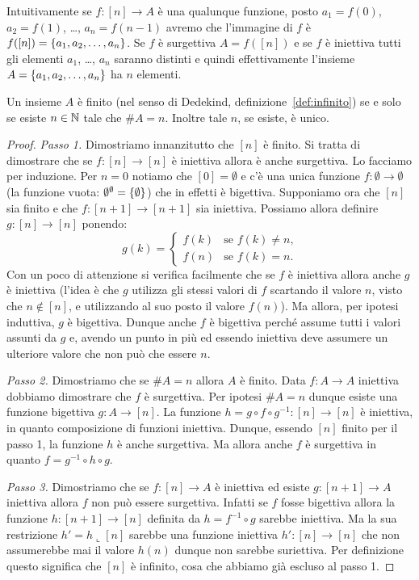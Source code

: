 Intuitivamente se $f\colon [n]\to A$ è una qualunque funzione, 
posto $a_1=f(0)$, $a_2=f(1)$, \dots, $a_{n}=f(n-1)$ 
avremo che l'immagine di $f$ è $f([n]) = {\left\{ a_1,a_2,\dots,a_n \right\}}$.
Se $f$ è surgettiva $A=f([n])$ e se $f$ è iniettiva 
tutti gli elementi $a_1$, \dots, $a_n$ saranno distinti
e quindi effettivamente l'insieme $A={\left\{ a_1,a_2,\dots,a_n \right\}}$
ha $n$ elementi.

\begin{theorem}
  \label{th:cardinali_finiti}%
Un insieme $A$ è finito
(nel senso di Dedekind, definizione~\ref{def:infinito})
se e solo se esiste $n\in {\mathbb N}$ tale che $\#A = n$.
Inoltre tale $n$, se esiste, è unico.
\end{theorem}
\begin{proof}
\emph{Passo 1.} Dimostriamo innanzitutto che $[n]$ è finito.
Si tratta di dimostrare che se $f\colon [n]\to [n]$ è iniettiva allora è anche surgettiva.
Lo facciamo per induzione. 
Per $n=0$ notiamo che $[0]=\emptyset$ e c'è una unica funzione $f\colon \emptyset \to \emptyset$
(la funzione vuota: $\emptyset^\emptyset = {\left\{ \emptyset \right\}}$)
che in effetti è bigettiva.
Supponiamo ora che $[n]$ sia finito e che $f\colon [n+1]\to [n+1]$ sia iniettiva.
Possiamo allora definire $g\colon[n]\to[n]$ ponendo:
\[
  g(k) = \begin{cases}
    f(k) & \text{se $f(k)\neq n$,}\\
    f(n) & \text{se $f(k)=n$.}
  \end{cases}
\]
Con un poco di attenzione si verifica facilmente che se $f$ è iniettiva allora anche $g$ è iniettiva
(l'idea è che $g$ utilizza gli stessi valori di $f$ scartando il valore $n$, visto che $n\not \in [n]$, 
e utilizzando al suo posto il valore $f(n)$).
Ma allora, per ipotesi induttiva, $g$ è bigettiva.
Dunque anche $f$ è bigettiva perché assume tutti i valori assunti da $g$  
e, avendo un punto in più ed essendo iniettiva deve assumere un ulteriore valore che non può 
che essere $n$.

\emph{Passo 2.}
Dimostriamo che se $\#A=n$ allora $A$ è finito.
Data $f\colon A\to A$ iniettiva dobbiamo dimostrare che $f$ è surgettiva.
Per ipotesi $\#A=n$ dunque esiste una funzione bigettiva $g\colon A\to [n]$.
La funzione $h=g\circ f\circ g^{-1}\colon [n]\to [n]$ è iniettiva, in quanto composizione di funzioni iniettiva.
Dunque, essendo $[n]$ finito per il passo 1, la funzione $h$ è anche surgettiva.
Ma allora anche $f$ è surgettiva in quanto $f=g^{-1}\circ h\circ g$.

\emph{Passo 3.} Dimostriamo che se $f\colon[n]\to A$ è iniettiva
ed esiste $g\colon[n+1]\to A$ iniettiva allora $f$ non può 
essere surgettiva.
Infatti se $f$ fosse bigettiva allora la funzione
$h\colon [n+1]\to [n]$ definita da $h=f^{-1}\circ g$ 
sarebbe iniettiva.
Ma la sua restrizione $h'=h \llcorner [n]$ sarebbe una funzione
iniettiva $h'\colon[n]\to[n]$ che non assumerebbe mai il valore 
$h(n)$ dunque non sarebbe suriettiva.
Per definizione questo significa che $[n]$ è infinito, 
cosa che abbiamo già escluso al passo 1.


\end{proof}
